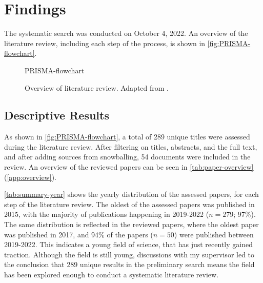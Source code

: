 \section{Findings}
\label{sec:Results}
The systematic search was conducted on October 4, 2022. An overview of the literature review, including each step of the process, is shown in \autoref{fig:PRISMA-flowchart}.

\begin{figure}[p]
    \centering
    {PRISMA-flowchart}
    \caption[Overview of literature review]{Overview of literature review. Adapted from \textcite{PRISMA_2022}.}
    \label{fig:PRISMA-flowchart}
\end{figure}


\subsection{Descriptive Results} %
As shown in \autoref{fig:PRISMA-flowchart}, a total of 289 unique titles were assessed during the literature review. After filtering on titles, abstracts, and the full text, and after adding sources from snowballing, 54 documents were included in the review. An overview of the reviewed papers can be seen in \autoref{tab:paper-overview} (\autoref{app:overview}).

\autoref{tab:summary-year} shows the yearly distribution of the assessed papers, for each step of the literature review. The oldest of the assessed papers was published in 2015, with the majority of publications happening in 2019-2022 ($n = 279$; 97\%). The same distribution is reflected in the reviewed papers, where the oldest paper was published in 2017, and 94\% of the papers ($n = 50$) were published between 2019-2022. This indicates a young field of science, that has just recently gained traction. Although the field is still young, discussions with my supervisor led to the conclusion that 289 unique results in the preliminary search means the field has been explored enough to conduct a systematic literature review.

